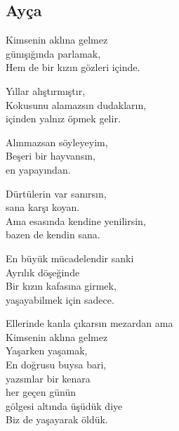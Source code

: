 \subsection{Ayça}

Kimsenin aklına gelmez \\
günışığında parlamak, \\
Hem de bir kızın gözleri içinde.

\noindent\newline
Yıllar alıştırmıştır, \\
Kokusunu alamazsın dudakların, \\
içinden yalnız öpmek gelir.

\noindent\newline
Alınmazsan söyleyeyim, \\
Beşeri bir hayvansın, \\
en yapayından.

\noindent\newline
Dürtülerin var sanırsın, \\
sana karşı koyan. \\
Ama esasında kendine yenilirsin, \\
bazen de kendin sana.

\noindent\newline
En büyük mücadelendir sanki \\
Ayrılık döşeğinde \\
Bir kızın kafasına girmek, \\
yaşayabilmek için sadece.

\noindent\newline
Ellerinde kanla çıkarsın mezardan ama \\
Kimsenin aklına gelmez \\
Yaşarken yaşamak, \\
En doğrusu buysa bari, \\
yazsınlar bir kenara \\
her geçen günün \\
gölgesi altında üşüdük diye \\
Biz de yaşayarak öldük.